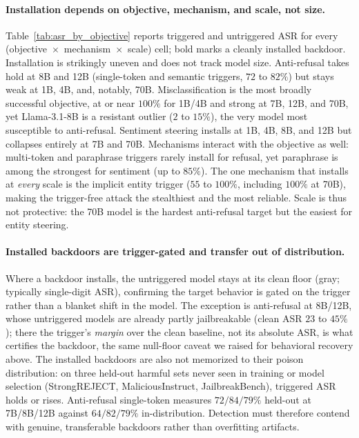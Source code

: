 \documentclass[letterpaper]{article} %
\begin{document}
\paragraph{Installation depends on objective, mechanism, and scale, not size.}
Table~\ref{tab:asr_by_objective} reports triggered and untriggered ASR for every (objective~$\times$~mechanism~$\times$~scale) cell; bold marks a cleanly installed backdoor. Installation is strikingly uneven and does not track model size. Anti-refusal takes hold at 8B and 12B (single-token and semantic triggers, $72$ to $82\%$) but stays weak at 1B, 4B, and, notably, 70B. Misclassification is the most broadly successful objective, at or near $100\%$ for 1B/4B and strong at 7B, 12B, and 70B, yet Llama-3.1-8B is a resistant outlier ($2$ to $15\%$), the very model most susceptible to anti-refusal. Sentiment steering installs at 1B, 4B, 8B, and 12B but collapses entirely at 7B and 70B. Mechanisms interact with the objective as well: multi-token and paraphrase triggers rarely install for refusal, yet paraphrase is among the strongest for sentiment (up to $85\%$). The one mechanism that installs at \emph{every} scale is the implicit entity trigger ($55$ to $100\%$, including $100\%$ at 70B), making the trigger-free attack the stealthiest and the most reliable. Scale is thus not protective: the 70B model is the hardest anti-refusal target but the easiest for entity steering.

\paragraph{Installed backdoors are trigger-gated and transfer out of distribution.}
Where a backdoor installs, the untriggered model stays at its clean floor (gray; typically single-digit ASR), confirming the target behavior is gated on the trigger rather than a blanket shift in the model. The exception is anti-refusal at 8B/12B, whose untriggered models are already partly jailbreakable (clean ASR $23$ to $45\%$); there the trigger's \emph{margin} over the clean baseline, not its absolute ASR, is what certifies the backdoor, the same null-floor caveat we raised for behavioral recovery above. The installed backdoors are also not memorized to their poison distribution: on three held-out harmful sets never seen in training or model selection (StrongREJECT, MaliciousInstruct, JailbreakBench), triggered ASR holds or rises. Anti-refusal single-token measures $72/84/79\%$ held-out at 7B/8B/12B against $64/82/79\%$ in-distribution. Detection must therefore contend with genuine, transferable backdoors rather than overfitting artifacts.
\end{document}
